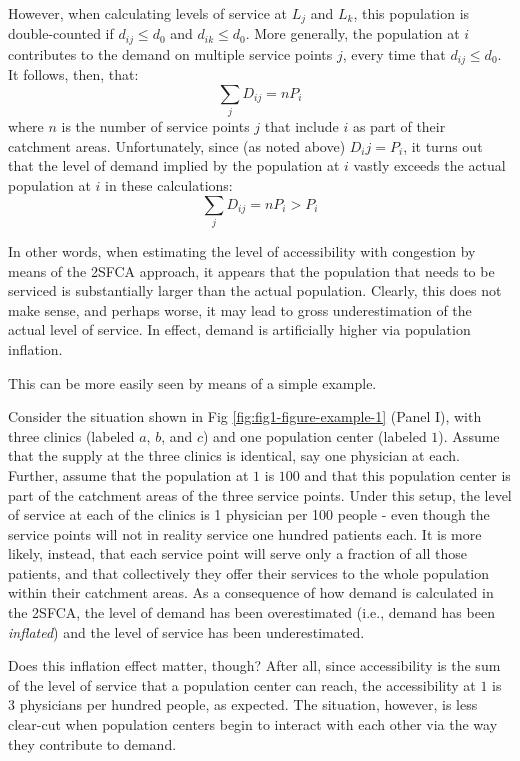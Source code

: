 \documentclass[10pt,letterpaper]{article}
\begin{document}
However, when calculating levels of service at \(L_j\) and \(L_k\), this
population is double-counted if \(d_{ij} \le d_0\) and
\(d_{ik} \leq d_0\). More generally, the population at \(i\) contributes
to the demand on multiple service points \(j\), every time that
\(d_{ij} \le d_0\). It follows, then, that: \[
\sum_j D_{ij} = nP_i
\] where \(n\) is the number of service points \(j\) that include \(i\)
as part of their catchment areas. Unfortunately, since (as noted above)
\(D_ij = P_i\), it turns out that the level of demand implied by the
population at \(i\) vastly exceeds the actual population at \(i\) in
these calculations: \[
\sum_j D_{ij} = nP_i > P_i
\]

In other words, when estimating the level of accessibility with
congestion by means of the 2SFCA approach, it appears that the
population that needs to be serviced is substantially larger than the
actual population. Clearly, this does not make sense, and perhaps worse,
it may lead to gross underestimation of the actual level of service. In
effect, demand is artificially higher via population inflation.

This can be more easily seen by means of a simple example.

Consider the situation shown in Fig \ref{fig:fig1-figure-example-1}
(Panel I), with three clinics (labeled \(a\), \(b\), and \(c\)) and one
population center (labeled \(1\)). Assume that the supply at the three
clinics is identical, say one physician at each. Further, assume that
the population at \(1\) is \(100\) and that this population center is
part of the catchment areas of the three service points. Under this
setup, the level of service at each of the clinics is 1 physician per
100 people - even though the service points will not in reality service
one hundred patients each. It is more likely, instead, that each service
point will serve only a fraction of all those patients, and that
collectively they offer their services to the whole population within
their catchment areas. As a consequence of how demand is calculated in
the 2SFCA, the level of demand has been overestimated (i.e., demand has
been \emph{inflated}) and the level of service has been underestimated.

Does this inflation effect matter, though? After all, since
accessibility is the sum of the level of service that a population
center can reach, the accessibility at \(1\) is 3 physicians per hundred
people, as expected. The situation, however, is less clear-cut when
population centers begin to interact with each other via the way they
contribute to demand.
\end{document}
